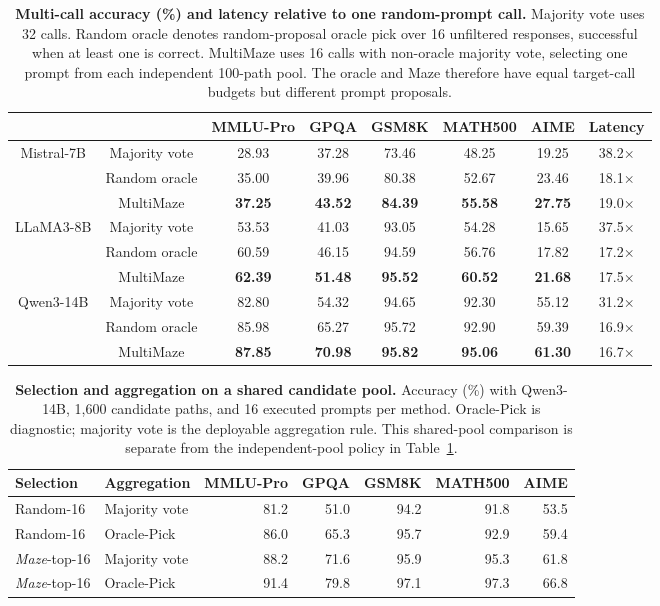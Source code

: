 \begin{table}[ht]
\caption{\textbf{Multi-call accuracy (\%) and latency relative to one random-prompt call.}
Majority vote uses 32 calls.
Random oracle denotes random-proposal oracle pick over 16 unfiltered responses, successful when at least one is correct.
MultiMaze uses 16 calls with non-oracle majority vote, selecting one prompt from each independent 100-path pool.
The oracle and Maze therefore have equal target-call budgets but different prompt proposals.}
\label{tab:multi_call_results}
\centering
\small
\begin{tabular}{@{}cccccccc@{}}
\toprule
 &  & MMLU-Pro & GPQA & GSM8K & MATH500 & AIME & Latency\\ \midrule
\multirow{3}{*}{Mistral-7B} 
 & Majority vote & 28.93 & 37.28 & 73.46 & 48.25 & 19.25 & 38.2$\times$\\
 & Random oracle & 35.00 & 39.96 & 80.38 & 52.67 & 23.46 & 18.1$\times$\\
 & MultiMaze & {\bf 37.25} & {\bf 43.52} & {\bf 84.39} & {\bf 55.58} & {\bf 27.75} & 19.0$\times$\\ \midrule
\multirow{3}{*}{LLaMA3-8B} 
 & Majority vote & 53.53 & 41.03 & 93.05 & 54.28 & 15.65 & 37.5$\times$\\
 & Random oracle & 60.59 & 46.15 & 94.59 & 56.76 & 17.82 & 17.2$\times$\\
 & MultiMaze & {\bf 62.39} & {\bf 51.48} & {\bf 95.52} & {\bf 60.52} & {\bf 21.68} & 17.5$\times$\\ \midrule
 \multirow{3}{*}{Qwen3-14B} 
 & Majority vote & 82.80 & 54.32 & 94.65 & 92.30 & 55.12 & 31.2$\times$\\
 & Random oracle & 85.98 & 65.27 & 95.72 & 92.90 & 59.39 & 16.9$\times$\\
 & MultiMaze & {\bf 87.85} & {\bf 70.98} & {\bf 95.82} & {\bf 95.06} & {\bf 61.30} & 16.7$\times$\\ \bottomrule
\end{tabular}
\end{table}

\begin{table}[t]
\centering
\caption{\textbf{Selection and aggregation on a shared candidate pool.}
Accuracy (\%) with Qwen3-14B, 1,600 candidate paths, and 16 executed prompts per method.
Oracle-Pick is diagnostic; majority vote is the deployable aggregation rule.
This shared-pool comparison is separate from the independent-pool policy in Table~\ref{tab:multi_call_results}.}
\label{tab:shared-pool}
\small
\begin{tabular}{@{}llrrrrr@{}}
\toprule
Selection & Aggregation & MMLU-Pro & GPQA & GSM8K & MATH500 & AIME\\
\midrule
Random-16 & Majority vote & 81.2 & 51.0 & 94.2 & 91.8 & 53.5\\
Random-16 & Oracle-Pick & 86.0 & 65.3 & 95.7 & 92.9 & 59.4\\
\emph{Maze}-top-16 & Majority vote & 88.2 & 71.6 & 95.9 & 95.3 & 61.8\\
\emph{Maze}-top-16 & Oracle-Pick & 91.4 & 79.8 & 97.1 & 97.3 & 66.8\\
\bottomrule
\end{tabular}
\end{table}

